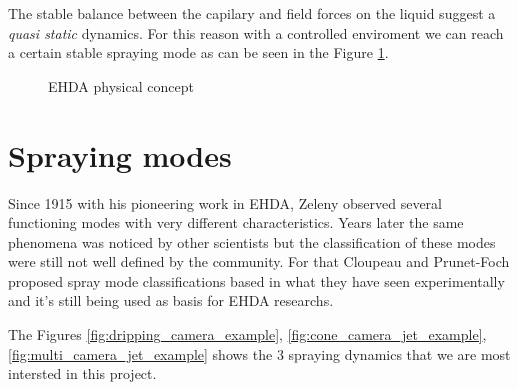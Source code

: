 The stable balance between the capilary and field forces on the liquid suggest a \emph{quasi static} dynamics.
For this reason with a controlled enviroment we can reach a certain stable spraying mode as can be seen in the Figure \ref{fig:ehda_setup_ex2}.

\begin{figure}[H]
  \centering
  \caption{EHDA physical concept \cite{Gabriel}}
  \label{fig:ehda_setup_ex2}
\end{figure}

\section{Spraying modes}
\label{sec:spraying_modes_subsec}

Since 1915 with his pioneering work in EHDA, Zeleny observed several functioning modes with very different characteristics.
Years later the same phenomena was noticed by other scientists but the classification of these modes were still not well defined by the community.
For that Cloupeau and Prunet-Foch proposed spray mode classifications based in what they have seen experimentally and it's still being used as basis for EHDA researchs.\cite{prunet}

The Figures \ref{fig:dripping_camera_example}, \ref{fig:cone_camera_jet_example}, \ref{fig:multi_camera_jet_example} shows the 3 spraying dynamics that we are most intersted in this project. 

